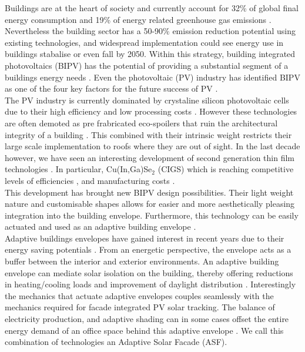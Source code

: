 
Buildings are at the heart of society and currently account for 32\% of global final energy consumption and 19\% of energy related greenhouse gas emissions \cite{IPCC}. Nevertheless the building sector has a 50-90\% emission reduction potential using existing technologies, and widespread implementation could see energy use in buildings stabalise or even fall by 2050. Within this strategy, building integrated photovoltaics (BIPV) has the potential of providing a substantial segment of a buildings energy needs \cite{Shoen1997}. Even the photovoltaic (PV) industry has identified BIPV as one of the four key factors for the future success of PV \cite{raugei2009life}. \\

The PV industry is currently dominated by crystaline silicon photovoltaic cells due to their high efficiency and low processing costs \cite{saga2010advances}. However these technologies are often demoted as pre frabricated eco-spoilers that ruin the architectural integrity of a building \cite{Lueling2009ee}. This combined with their intrinsic weight restricts their large scale implementation to roofs where they are out of sight. In the last decade however, we have seen an interesting development of second generation thin film technologies \cite{NREL}. In particular, Cu(In,Ga)Se$_2$ (CIGS) which is reaching  competitive levels of efficiencies \cite{kushiya2014cis}, and manufacturing costs \cite{kaelin2004low} \cite{jelle2012building}.\\

This development has brought new BIPV design possibilities. Their light weight nature and customisable shapes allows for easier and more aesthetically pleasing integration into the building envelope. Furthermore, this technology can be easily actuated and used as an adaptive building envelope \cite{rossi2012adaptive}. \\

Adaptive buildings envelopes have gained interest in recent years due to their energy saving potentials \cite{loonen2013climate}. From an energetic perspective, the envelope acts as a buffer between the interior and exterior environments. An adaptive building envelope can mediate solar isolation on the building, thereby offering reductions in heating/cooling loads and improvement of daylight distribution \cite{rossi2012adaptive}. Interestingly the mechanics that actuate adaptive envelopes couples seamlessly with the mechanics required for facade integrated PV solar tracking. The balance of electricity production, and adaptive shading can in some cases offset the entire energy demand of an office space behind this adaptive envelope \cite{jayathissa2015abs}. We call this combination of technologies an Adaptive Solar Facade (ASF).\\

